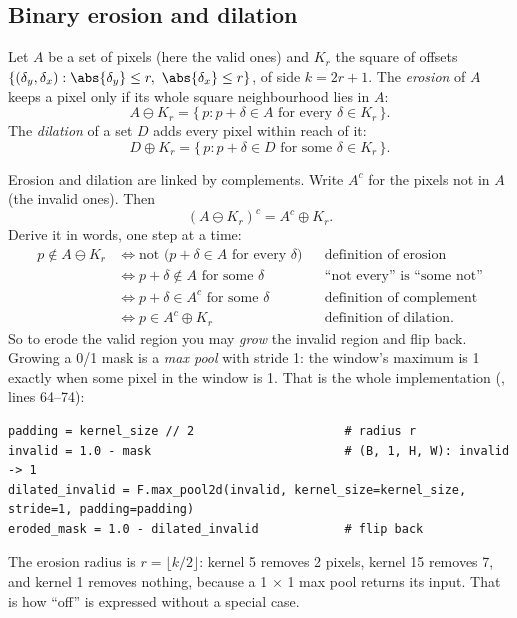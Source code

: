 \subsection{Binary erosion and dilation}

\begin{definition}
Let $A$ be a set of pixels (here the valid ones) and $K_r$ the square of offsets
$\{(\delta_y, \delta_x) : \abs{\delta_y} \le r,\ \abs{\delta_x} \le r\}$, of side $k = 2r + 1$. The
\emph{erosion} of $A$ keeps a pixel only if its whole square neighbourhood lies in $A$:
\[
A \ominus K_r = \{\, p : p + \delta \in A \text{ for every } \delta \in K_r \,\}.
\]
The \emph{dilation} of a set $D$ adds every pixel within reach of it:
\[
D \oplus K_r = \{\, p : p + \delta \in D \text{ for some } \delta \in K_r \,\}.
\]
\end{definition}

Erosion and dilation are linked by complements. Write $A^c$ for the pixels not in $A$ (the invalid
ones). Then
\begin{equation}\label{eq:masking:duality}
(A \ominus K_r)^c = A^c \oplus K_r .
\end{equation}
Derive it in words, one step at a time:
\begin{align*}
p \notin A \ominus K_r
&\iff \text{not } \big(p + \delta \in A \text{ for every } \delta\big) && \text{definition of erosion}\\
&\iff p + \delta \notin A \text{ for some } \delta && \text{``not every'' is ``some not''}\\
&\iff p + \delta \in A^c \text{ for some } \delta && \text{definition of complement}\\
&\iff p \in A^c \oplus K_r && \text{definition of dilation.}
\end{align*}
So to erode the valid region you may \emph{grow} the invalid region and flip back. Growing a 0/1 mask is
a \emph{max pool} with stride 1: the window's maximum is 1 exactly when some pixel in
the window is 1. That is the whole implementation (, lines 64--74):
\begin{lstlisting}
padding = kernel_size // 2                     # radius r
invalid = 1.0 - mask                           # (B, 1, H, W): invalid -> 1
dilated_invalid = F.max_pool2d(invalid, kernel_size=kernel_size, stride=1, padding=padding)
eroded_mask = 1.0 - dilated_invalid            # flip back
\end{lstlisting}
The erosion radius is $r = \lfloor k/2 \rfloor$: kernel 5 removes 2 pixels, kernel 15 removes 7, and
kernel 1 removes nothing, because a 1 $\times$ 1 max pool returns its input. That is how ``off'' is
expressed without a special case.

